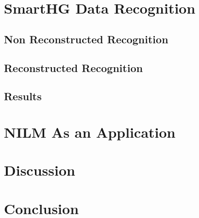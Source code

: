
 

 

\chapter{SmartHG Data Recognition} 
\section{Non Reconstructed Recognition }
\section{Reconstructed Recognition }
\section{Results}

\chapter{NILM As an Application} 

\chapter{Discussion}

\chapter{Conclusion}
\begingroup
	\raggedright
	
\endgroup

